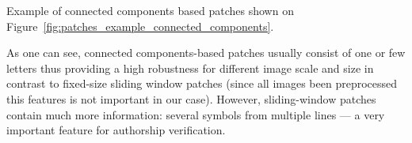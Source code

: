 \documentclass[conference,a4paper]{ieeetran}
\begin{document}
Example of connected components based patches shown on Figure~\ref{fig:patches_example_connected_components}. 

As one can see, connected components-based patches usually consist of one or few letters thus providing a high robustness for different image scale and size in contrast to fixed-size sliding window patches (since all images been preprocessed this features is not important in our case). However, sliding-window patches contain much more information: several symbols from multiple lines --- a very important feature for authorship verification.
%

\end{document}

